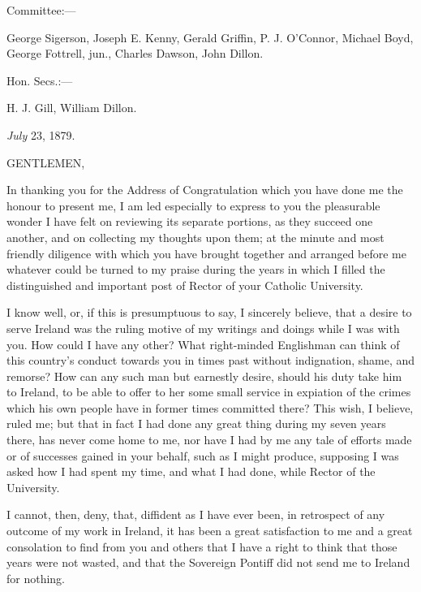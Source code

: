 Committee:—

George Sigerson, Joseph E. Kenny, Gerald Griffin, P. J.
O'Connor, Michael Boyd, George Fottrell, jun., Charles Dawson, John
Dillon.

Hon. Secs.:—

H. J. Gill, William Dillon.


\emph{July} 23, 1879.

GENTLEMEN,

In thanking you for the Address of Congratulation which you have done
me the honour to present me, I am led especially to express to you the
pleasurable wonder I have felt on reviewing its separate portions, as
they succeed one another, and on collecting my thoughts upon them; at
the minute and most friendly diligence with which you have brought
together and arranged before me whatever could be turned to my praise
during the years in which I filled the distinguished and important
post of Rector of your Catholic University.

I know well, or, if this is presumptuous to say, I sincerely
believe, that a desire to serve Ireland was the ruling motive of
my writings and doings while I was with you. How could I have any
other? What right-minded Englishman can think of this country's
conduct towards you in times past without indignation, shame, and
remorse? How can any such man but earnestly desire, should his duty
take him to Ireland, to be able to offer to her some small service in
expiation of the crimes which his own people have in former times
committed there? This wish, I believe, ruled me; but that in fact I
had done any great thing during my seven years there, has never come
home to me, nor have I had by me any tale of efforts made or of
successes gained in your behalf, such as I might produce, supposing I
was asked how I had spent my time, and what I had done, while Rector
of the University.

I cannot, then, deny, that, diffident as I have ever been, in
retrospect of any outcome of my work in Ireland, it has been a great
satisfaction to me and a great consolation to find from you and others
that I have a right to think that those years were not wasted, and
that the Sovereign Pontiff did not send me to Ireland for nothing.


